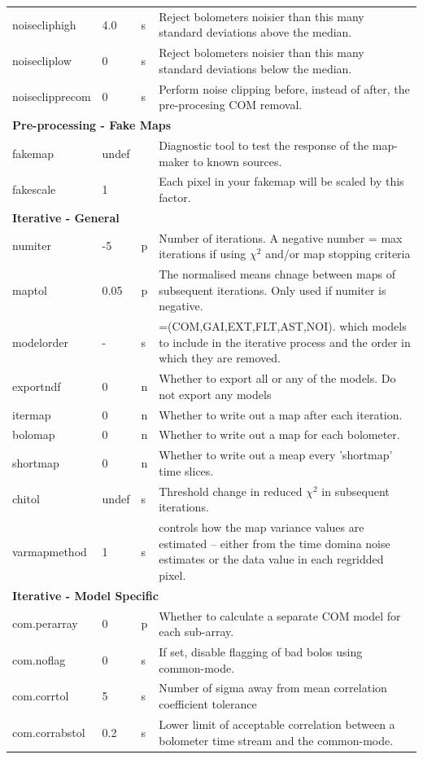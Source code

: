 \documentclass[twoside,11pt]{article}
\renewcommand{\_}{\texttt{\symbol{95}}}
\begin{document}
\begin{htmlonly}
\begin{table}
\begin{center}
\begin{footnotesize}
\begin{tabular}{|p{2.1cm}|p{0.8cm}|p{0.2cm}|p{11.2cm}|}
 noisecliphigh & 4.0 &s &Reject bolometers noisier than this many standard deviations above the median.\\
 noisecliplow & 0 &s& Reject bolometers noisier than this many standard deviations below the median.\\
 noiseclipprecom & 0 &s &Perform noise clipping before, instead of after, the pre-procesing COM removal.\\
\hline
\multicolumn{4}{|l|}{\textbf{Pre-processing - Fake Maps}}\\
\hline
fakemap & undef&& Diagnostic tool to test the response of the map-maker to known sources.  \\
fakescale & 1 && Each pixel in your fakemap will be scaled by this factor. \\
\hline
\multicolumn{4}{|l|}{\textbf{Iterative - General}}\\
\hline
numiter & -5 &p& Number of iterations. A negative number = max iterations
                       if using $\chi^2$ and/or map stopping criteria\\
maptol & 0.05 &p &The normalised means chnage between maps of subsequent iterations. Only used if numiter is negative.\\
modelorder & - &s& =(COM,GAI,EXT,FLT,AST,NOI). which models to include in the iterative process and the order in which they are removed. \\
exportndf & 0 &n& Whether to export all or any of the models. Do not export any models\\
itermap & 0 &n& Whether to write out a map after each iteration.\\
bolomap & 0 &n& Whether to write out a map for each bolometer.\\
shortmap & 0 &n& Whether to write out a meap every 'shortmap' time slices.\\
chitol & undef &s& Threshold change in reduced $\chi^2$ in subsequent
                       iterations.\\
varmapmethod & 1 &s& controls how the map variance values are estimated -- either from the time domina noise estimates or the data value in each regridded pixel.\\

\hline
 \multicolumn{4}{|l|}{\textbf{Iterative - Model Specific}}\\
\hline
com.perarray & 0 &p &Whether to calculate a separate COM model for each sub-array. \\
com.noflag & 0  &s& If set, disable flagging of bad bolos using common-mode.\\
com.corr\_tol & 5  &s& Number of sigma away from mean correlation coefficient tolerance\\
com.corr\_abstol  &  0.2 & s &Lower limit of acceptable correlation between a bolometer time stream and the common-mode. \\


\end{tabular}
\end{footnotesize}
\end{center}
\end{table}
\end{htmlonly}
\end{document}
